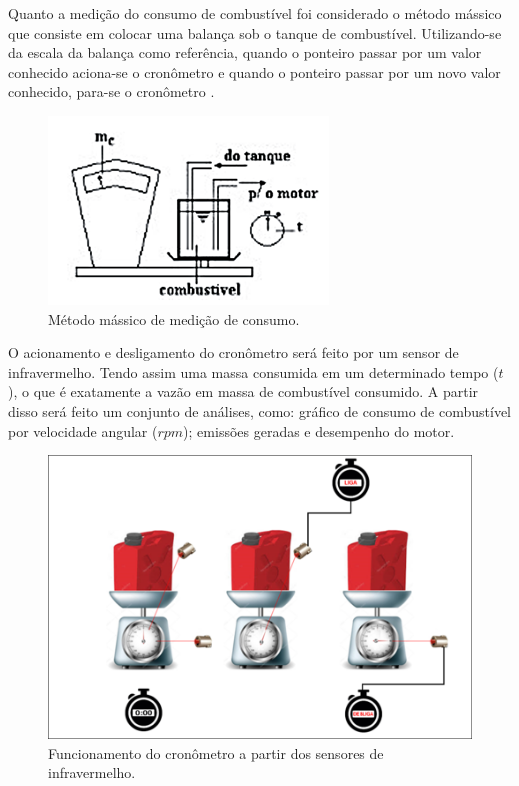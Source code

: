 Quanto a medição do consumo de combustível foi considerado o método mássico que consiste em colocar uma balança sob o tanque de combustível. Utilizando-se da escala da balança como referência, quando o ponteiro passar por um valor conhecido aciona-se o cronômetro e quando o ponteiro passar por um novo valor conhecido, para-se o cronômetro \cite{taylor}.

\begin{figure}[h!]
	\centering
	\includegraphics[keepaspectratio=true,scale= 0.6]{figuras/medicao-de-consumo.png}
	\caption{Método mássico de medição de consumo.}
	\label{medicao-de-consumo}
\end{figure}

 O acionamento e desligamento do cronômetro será feito por um sensor de infravermelho. Tendo assim uma massa consumida em um determinado tempo ($t$), o que é exatamente a vazão em massa de combustível consumido. A partir disso será feito um conjunto de análises, como: gráfico de consumo de combustível por velocidade angular ($rpm$); emissões geradas e desempenho do motor.

\begin{figure}[h!]
	\centering
	\includegraphics[keepaspectratio=true,scale= 0.6]{figuras/funcionamento-cronometro.png}
	\caption{Funcionamento do cronômetro a partir dos sensores de infravermelho.}
	\label{funcionamento-cronometro}
\end{figure}